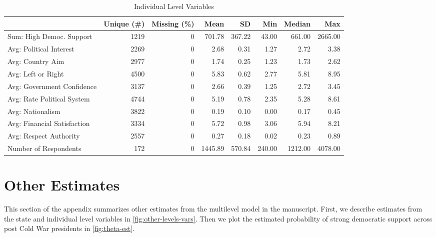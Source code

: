 \documentclass[12pt]{article}
\begin{document}
\begin{table}
\caption{\label{tab:wvs-vars}Individual Level Variables}
\begin{adjustbox}{width= .95\textwidth, center}
\begin{tabular}[t]{lrrrrrrr}
\toprule
  & Unique (\#) & Missing (\%) & Mean & SD & Min & Median & Max\\
\midrule
Sum: High Democ. Support & 1219 & 0 & 701.78 & 367.22 & 43.00 & 661.00 & 2665.00\\
Avg: Political Interest & 2269 & 0 & 2.68 & 0.31 & 1.27 & 2.72 & 3.38\\
Avg: Country Aim & 2977 & 0 & 1.74 & 0.25 & 1.23 & 1.73 & 2.62\\
Avg: Left or Right & 4500 & 0 & 5.83 & 0.62 & 2.77 & 5.81 & 8.95\\
Avg: Government Confidence & 3137 & 0 & 2.66 & 0.39 & 1.25 & 2.72 & 3.45\\
Avg: Rate Political System & 4744 & 0 & 5.19 & 0.78 & 2.35 & 5.28 & 8.61\\
Avg: Nationalism & 3822 & 0 & 0.19 & 0.10 & 0.00 & 0.17 & 0.45\\
Avg: Financial Satisfaction & 3334 & 0 & 5.72 & 0.98 & 3.06 & 5.94 & 8.21\\
Avg: Respect Authority & 2557 & 0 & 0.27 & 0.18 & 0.02 & 0.23 & 0.89\\
Number of Respondents & 172 & 0 & 1445.89 & 570.84 & 240.00 & 1212.00 & 4078.00\\
\bottomrule
\end{tabular}
\end{adjustbox}
\end{table}


\section{Other Estimates}


This section of the appendix summarizes other estimates from the multilevel model in the manuscript. 
First, we describe estimates from the state and individual level variables in \autoref{fig:other-levels-vars}. 
Then we plot the estimated probability of strong democratic support across post Cold War presidents in \autoref{fig:theta-est}. 
\end{document}
